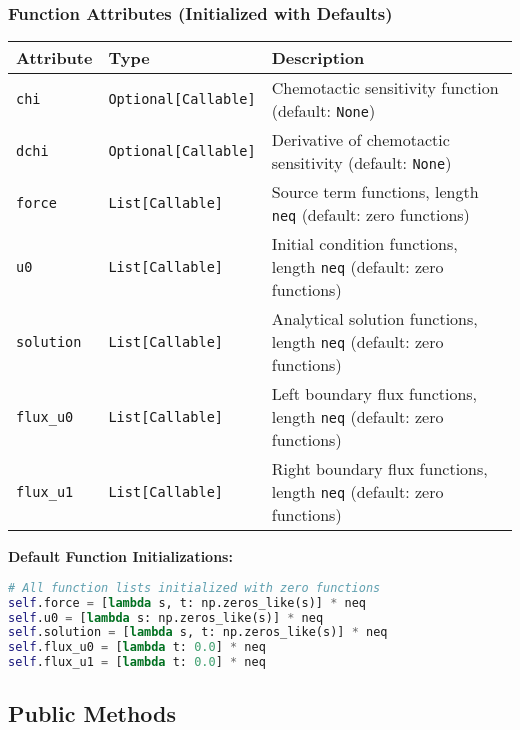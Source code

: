 \subsubsection{Function Attributes (Initialized with Defaults)}

\begin{longtable}{|p{3.5cm}|p{3cm}|p{7cm}|}
\hline
\textbf{Attribute} & \textbf{Type} & \textbf{Description} \\
\hline
\endhead

\texttt{chi} & \texttt{Optional[Callable]} & Chemotactic sensitivity function (default: \texttt{None}) \\
\hline

\texttt{dchi} & \texttt{Optional[Callable]} & Derivative of chemotactic sensitivity (default: \texttt{None}) \\
\hline

\texttt{force} & \texttt{List[Callable]} & Source term functions, length \texttt{neq} (default: zero functions) \\
\hline

\texttt{u0} & \texttt{List[Callable]} & Initial condition functions, length \texttt{neq} (default: zero functions) \\
\hline

\texttt{solution} & \texttt{List[Callable]} & Analytical solution functions, length \texttt{neq} (default: zero functions) \\
\hline

\texttt{flux\_u0} & \texttt{List[Callable]} & Left boundary flux functions, length \texttt{neq} (default: zero functions) \\
\hline

\texttt{flux\_u1} & \texttt{List[Callable]} & Right boundary flux functions, length \texttt{neq} (default: zero functions) \\
\hline

\end{longtable}

\textbf{Default Function Initializations:}
\begin{lstlisting}[language=Python, caption=Default Function Initializations]
# All function lists initialized with zero functions
self.force = [lambda s, t: np.zeros_like(s)] * neq
self.u0 = [lambda s: np.zeros_like(s)] * neq  
self.solution = [lambda s, t: np.zeros_like(s)] * neq
self.flux_u0 = [lambda t: 0.0] * neq
self.flux_u1 = [lambda t: 0.0] * neq
\end{lstlisting}

\subsection{Public Methods}
\label{subsec:public_methods}

